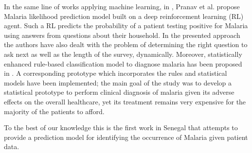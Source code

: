 In the same line of works applying machine learning, in \cite{Pr17}, Pranav et al. propose Malaria likelihood prediction model built on a deep reinforcement learning (RL) agent. 
Such a RL predicts the probability of a patient testing positive for Malaria using answers from questions about their household. In 
the presented approach the authors have also dealt with the problem of determining the right question to ask next as well as the length of the survey, dynamically.
Moreover, statistically enhanced rule-based classification model to diagnose malaria has been proposed in \cite{Bb16}. A corresponding prototype 
which incorporates the rules and statistical models have been implemented; the main goal of the study was to develop a statistical 
prototype to perform clinical diagnosis of malaria given its adverse effects on the overall healthcare, yet its treatment remains 
very expensive for the majority of the patients to afford.

To the best of our knowledge this is the first work in Senegal that attempts to provide a prediction model for identifying 
the occurrence of Malaria given patient data.  

